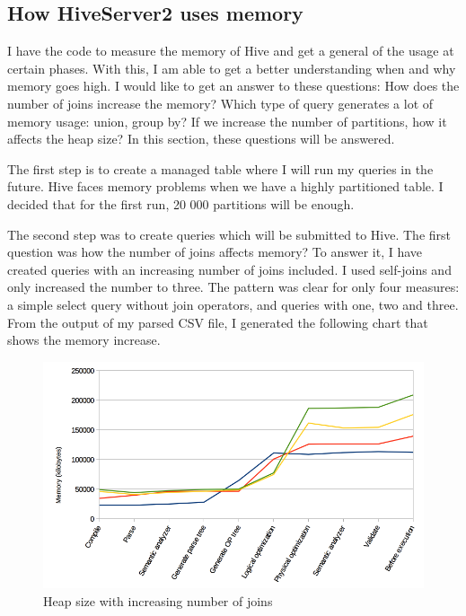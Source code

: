 \subsection{How HiveServer2 uses memory}
I have the code to measure the memory of Hive and get a general  of the usage at certain phases. With this, I am able to get a better understanding when and why memory goes high. I would like to get an answer to these questions: How does the number of joins increase the memory? Which type of query generates a lot of memory usage: union, group by? If we increase the number of partitions, how it affects the heap size? In this section, these questions will be answered.

The first step is to create a managed table where I will run my queries in the future. Hive faces memory problems when we have a highly partitioned table. I decided that for the first run, 20 000 partitions will be enough. 

The second step was to create queries which will be submitted to Hive. The first question was how the number of joins affects memory? To answer it, I have created queries with an increasing number of joins included. I used self-joins and only increased the number to three. The pattern was clear for only four measures: a simple select query without join operators, and queries with one, two and three. From the output of my parsed CSV file, I generated the following chart that shows the memory increase.

\begin{figure}[H]
	\includegraphics[width=150mm, keepaspectratio]{figures/hs2_joins_memory.png}
	\centering
	\caption{Heap size with increasing number of joins}
\end{figure}

